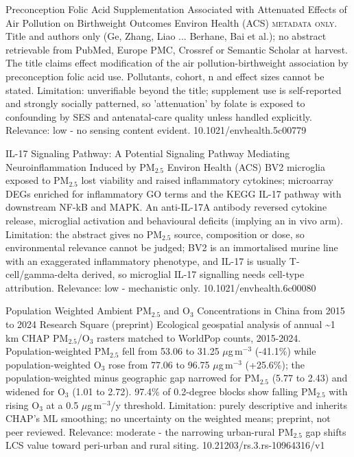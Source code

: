 \documentclass[10pt]{article}
\begin{document}
{Preconception Folic Acid Supplementation Associated with Attenuated Effects of Air Pollution on Birthweight Outcomes}
{Environ Health (ACS)}
{\textsc{metadata only.} Title and authors only (Ge, Zhang, Liao ... Berhane, Bai et al.); no abstract retrievable from PubMed, Europe PMC, Crossref or Semantic Scholar at harvest. The title claims effect modification of the air pollution-birthweight association by preconception folic acid use. Pollutants, cohort, n and effect sizes cannot be stated. Limitation: unverifiable beyond the title; supplement use is self-reported and strongly socially patterned, so 'attenuation' by folate is exposed to confounding by SES and antenatal-care quality unless handled explicitly. Relevance: low - no sensing content evident.}
{10.1021/envhealth.5c00779}

\par{}\baselineskip{}\baselineskip
{}

{IL-17 Signaling Pathway: A Potential Signaling Pathway Mediating Neuroinflammation Induced by PM$_{2.5}$}
{Environ Health (ACS)}
{BV2 microglia exposed to PM$_{2.5}$ lost viability and raised inflammatory cytokines; microarray DEGs enriched for inflammatory GO terms and the KEGG IL-17 pathway with downstream NF-kB and MAPK. An anti-IL-17A antibody reversed cytokine release, microglial activation and behavioural deficits (implying an in vivo arm). Limitation: the abstract gives no PM$_{2.5}$ source, composition or dose, so environmental relevance cannot be judged; BV2 is an immortalised murine line with an exaggerated inflammatory phenotype, and IL-17 is usually T-cell/gamma-delta derived, so microglial IL-17 signalling needs cell-type attribution. Relevance: low - mechanistic only.}
{10.1021/envhealth.6c00080}

\par{}\baselineskip{}\baselineskip
{}

{Population Weighted Ambient PM$_{2.5}$ and O$_3$ Concentrations in China from 2015 to 2024}
{Research Square (preprint)}
{Ecological geospatial analysis of annual \textasciitilde{}1 km CHAP PM$_{2.5}$/O$_3$ rasters matched to WorldPop counts, 2015-2024. Population-weighted PM$_{2.5}$ fell from 53.06 to 31.25 $\mu$g\,m$^{-3}$ (-41.1\%) while population-weighted O$_3$ rose from 77.06 to 96.75 $\mu$g\,m$^{-3}$ (+25.6\%); the population-weighted minus geographic gap narrowed for PM$_{2.5}$ (5.77 to 2.43) and widened for O$_3$ (1.01 to 2.72). 97.4\% of 0.2-degree blocks show falling PM$_{2.5}$ with rising O$_3$ at a 0.5 $\mu$g\,m$^{-3}$/y threshold. Limitation: purely descriptive and inherits CHAP's ML smoothing; no uncertainty on the weighted means; preprint, not peer reviewed. Relevance: moderate - the narrowing urban-rural PM$_{2.5}$ gap shifts LCS value toward peri-urban and rural siting.}
{10.21203/rs.3.rs-10964316/v1}
\end{document}
